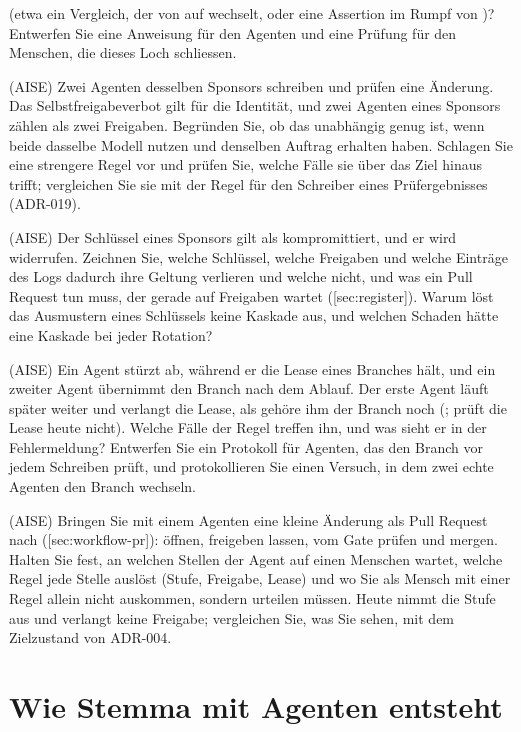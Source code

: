 (etwa ein Vergleich, der von \type{==} auf \type{>=} wechselt,
oder eine Assertion im Rumpf von )?
Entwerfen Sie eine Anweisung für den Agenten und eine Prüfung für den Menschen,
die dieses Loch schliessen.
\item (AISE) Zwei Agenten desselben Sponsors schreiben und prüfen eine Änderung.
Das Selbstfreigabeverbot gilt für die Identität, und zwei Agenten eines Sponsors
zählen als zwei Freigaben.
Begründen Sie, ob das unabhängig genug ist, wenn beide dasselbe Modell nutzen
und denselben Auftrag erhalten haben.
Schlagen Sie eine strengere Regel vor und prüfen Sie,
welche Fälle sie über das Ziel hinaus trifft;
vergleichen Sie sie mit der Regel für den Schreiber eines Prüfergebnisses (ADR-019).
\item (AISE) Der Schlüssel eines Sponsors gilt als kompromittiert, und er wird widerrufen.
Zeichnen Sie, welche Schlüssel, welche Freigaben und welche Einträge des Logs dadurch
ihre Geltung verlieren und welche nicht, und was ein Pull Request tun muss, der gerade
auf Freigaben wartet ([sec:register]).
Warum löst das Ausmustern eines Schlüssels keine Kaskade aus,
und welchen Schaden hätte eine Kaskade bei jeder Rotation?
\item (AISE) Ein Agent stürzt ab, während er die Lease eines Branches hält,
und ein zweiter Agent übernimmt den Branch nach dem Ablauf.
Der erste Agent läuft später weiter und verlangt die Lease, als gehöre ihm der Branch noch
(;  prüft die Lease heute nicht).
Welche Fälle der Regel treffen ihn, und was sieht er in der Fehlermeldung?
Entwerfen Sie ein Protokoll für Agenten, das den Branch vor jedem Schreiben prüft,
und protokollieren Sie einen Versuch, in dem zwei echte Agenten den Branch wechseln.
\item (AISE) Bringen Sie mit einem Agenten eine kleine Änderung als Pull Request nach 
([sec:workflow-pr]): öffnen, freigeben lassen, vom Gate prüfen und mergen.
Halten Sie fest, an welchen Stellen der Agent auf einen Menschen wartet,
welche Regel jede Stelle auslöst (Stufe, Freigabe, Lease) und wo Sie als Mensch
mit einer Regel allein nicht auskommen, sondern urteilen müssen.
Heute nimmt  die Stufe aus  und verlangt keine Freigabe;
vergleichen Sie, was Sie sehen, mit dem Zielzustand von ADR-004.
\stopitemize

\section[sec:agents]{Wie Stemma mit Agenten entsteht}

